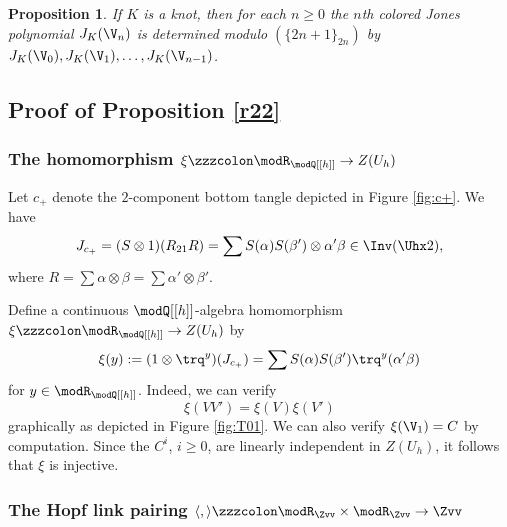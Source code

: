 \documentclass{amsart}
\numberwithin{equation}{section}
\numberwithin{figure}{section}
\theoremstyle{plain}
\newtheorem{proposition}[theorem]{Proposition}
\theoremstyle{definition}
\theoremstyle{remark}
\begin{document}
\begin{proposition}
  \label{r36}
  If $K$ is a knot, then for each $n\ge 0$ the $n$th colored Jones
  polynomial $J_K(\V_n)$ is determined modulo $(\{2n+1\}_{2n})$ by
  $J_K(\V_0),J_K(\V_1),\ldots,J_K(\V_{n-1})$.
\end{proposition}

\subsection{Proof of Proposition \ref{r22}}
\label{sec:proof-prop-refr22}

\subsubsection{The homomorphism $\xi \zzzcolon \modR _{\modQ [[h]]}\rightarrow Z(U_h)$}
\label{sec:isomorphism-ztu}

Let $c_+$ denote the $2$-component bottom tangle depicted in Figure
\ref{fig:c+}.  
We have
\begin{equation*}
  J_{c_+}= (S\otimes 1)(R_{21}R)=\sum S(\alpha )S(\beta ')\otimes \alpha '\beta \in \Inv(\Uhx2),
\end{equation*}
where $R=\sum\alpha \otimes \beta =\sum\alpha '\otimes \beta '$.

Define a continuous $\modQ [[h]]$-algebra homomorphism
\begin{math}
  \xi \zzzcolon \modR _{\modQ [[h]]} \rightarrow  Z(U_h)
\end{math}
by
\begin{equation*}
  \xi (y) :=  (1\otimes \trq^y)(J_{c_+})
  =\sum S(\alpha )S(\beta ')\trq^y(\alpha '\beta )
\end{equation*}
for $y\in \modR _{\modQ [[h]]}$.  Indeed, we can verify
\begin{equation}
  \label{e35}
  \xi (VV')=\xi (V)\xi (V')
\end{equation}
graphically as depicted in Figure \ref{fig:T01}.    We can also verify $\xi (\V_1)=C$ by
computation.  Since the $C^i$, $i\ge 0$, are linearly independent in
$Z(U_h)$, it follows that $\xi $ is injective.

\subsubsection{The Hopf link pairing $\langle ,\rangle \zzzcolon \modR _{\Zvv}\times \modR _{\Zvv}\rightarrow \Zvv$}
\label{sec:pairing-hhh}
\end{document}
